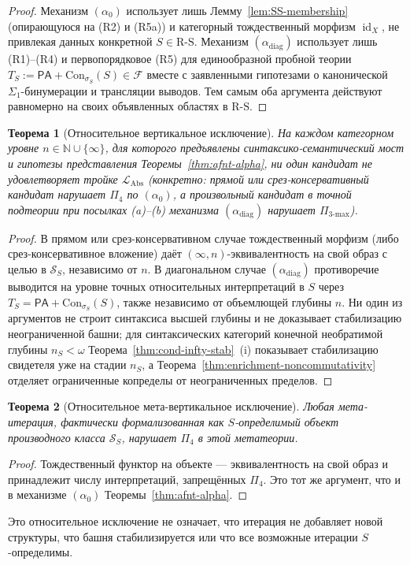 \documentclass[11pt]{article}
\theoremstyle{plain}
\newtheorem{theorem}{Теорема}[section]
\theoremstyle{definition}
\newcommand{\RS}{\mathrm{R\text{-}S}}
\newcommand{\cS}{\mathcal{S}}
\newcommand{\cF}{\mathcal{F}}
\newcommand{\LAbs}{\mathcal{L}_{\mathrm{Abs}}}
\newcommand{\Con}{\mathrm{Con}}
\newcommand{\PA}{\mathsf{PA}}
\DeclareMathOperator{\id}{id}
\begin{document}
\begin{proof}
Механизм $(\alpha_0)$ использует лишь Лемму~\ref{lem:SS-membership} (опирающуюся на (R2) и (R5a)) и категорный тождественный морфизм $\id_X$, не привлекая данных конкретной $S \in \RS$. Механизм $(\alpha_{\mathrm{diag}})$ использует лишь (R1)--(R4) и первопорядковое (R5) для единообразной пробной теории $T_S := \PA + \Con_{\sigma_S}(S) \in \cF$ вместе с заявленными гипотезами о канонической $\Sigma_1$-бинумерации и трансляции выводов. Тем самым оба аргумента действуют равномерно на своих объявленных областях в $\RS$.
\end{proof}

\begin{theorem}[Относительное вертикальное исключение]\label{thm:vertical}
На каждом категорном уровне $n \in \mathbb{N} \cup \{\infty\}$, для которого предъявлены синтаксико-семантический мост и гипотезы представления Теоремы~\ref{thm:afnt-alpha}, ни один кандидат не удовлетворяет тройке $\LAbs$ (конкретно: прямой или срез-консервативный кандидат нарушает $\Pi_4$ по $(\alpha_0)$, а произвольный кандидат в точной подтеории при посылках (a)--(b) механизма $(\alpha_{\mathrm{diag}})$ нарушает $\Pi_{3\text{-max}}$).
\end{theorem}
\begin{proof}
В прямом или срез-консервативном случае тождественный морфизм (либо срез-консервативное вложение) даёт $(\infty, n)$-эквивалентность на свой образ с целью в $\cS_S$, независимо от $n$. В диагональном случае $(\alpha_{\mathrm{diag}})$ противоречие выводится на уровне точных относительных интерпретаций в $S$ через $T_S = \PA + \Con_{\sigma_S}(S)$, также независимо от объемлющей глубины $n$. Ни один из аргументов не строит синтаксиса высшей глубины и не доказывает стабилизацию неограниченной башни; для синтаксических категорий конечной необратимой глубины $n_S < \omega$ Теорема~\ref{thm:cond-infty-stab}~(i) показывает стабилизацию свидетеля уже на стадии $n_S$, а Теорема~\ref{thm:enrichment-noncommutativity} отделяет ограниченные копределы от неограниченных пределов.
\end{proof}

\begin{theorem}[Относительное мета-вертикальное исключение]\label{thm:meta-vertical}
Любая мета-итерация, фактически формализованная как $S$-определимый объект производного класса $\cS_S$, нарушает $\Pi_4$ в этой метатеории.
\end{theorem}
\begin{proof}
Тождественный функтор на объекте — эквивалентность на свой образ и принадлежит числу интерпретаций, запрещённых $\Pi_4$. Это тот же аргумент, что и в механизме $(\alpha_0)$ Теоремы~\ref{thm:afnt-alpha}.
\end{proof}
Это относительное исключение не означает, что итерация не добавляет новой структуры, что башня стабилизируется или что все возможные итерации $S$-определимы.
\end{document}
